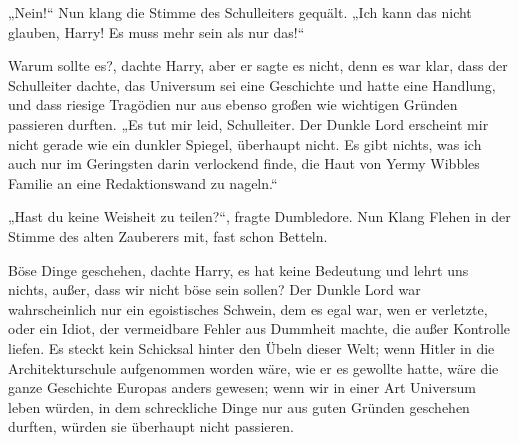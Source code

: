„Nein!“ Nun klang die Stimme des Schulleiters gequält. „Ich kann das nicht glauben, Harry! Es muss mehr sein als nur das!“

Warum sollte es?, dachte Harry, aber er sagte es nicht, denn es war klar, dass der Schulleiter dachte, das Universum sei eine Geschichte und hatte eine Handlung, und dass riesige Tragödien nur aus ebenso großen wie wichtigen Gründen passieren durften. „Es tut mir leid, Schulleiter. Der Dunkle Lord erscheint mir nicht gerade wie ein dunkler Spiegel, überhaupt nicht. Es gibt nichts, was ich auch nur im Geringsten darin verlockend finde, die Haut von Yermy Wibbles Familie an eine Redaktionswand zu nageln.“

„Hast du keine Weisheit zu teilen?“, fragte Dumbledore. Nun Klang Flehen in der Stimme des alten Zauberers mit, fast schon Betteln.

Böse Dinge geschehen, dachte Harry, es hat keine Bedeutung und lehrt uns nichts, außer, dass wir nicht böse sein sollen? Der Dunkle Lord war wahrscheinlich nur ein egoistisches Schwein, dem es egal war, wen er verletzte, oder ein Idiot, der vermeidbare Fehler aus Dummheit machte, die außer Kontrolle liefen. Es steckt kein Schicksal hinter den Übeln dieser Welt; wenn Hitler in die Architekturschule aufgenommen worden wäre, wie er es gewollte hatte, wäre die ganze Geschichte Europas anders gewesen; wenn wir in einer Art Universum leben würden, in dem schreckliche Dinge nur aus guten Gründen geschehen durften, würden sie überhaupt nicht passieren.

